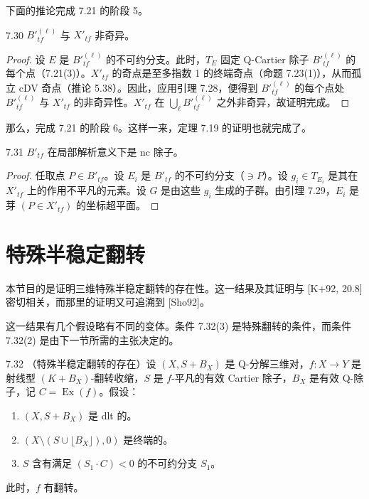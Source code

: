 下面的推论完成 7.21 的阶段 5。

\begin{corollaryp}{7.30}
$B'^{(\ell)}_{tf}$ 与 $X'_{tf}$ 非奇异。
\end{corollaryp}

\begin{proof}
设 $E$ 是 $B'^{(\ell)}_{tf}$ 的不可约分支。此时，$T_E$ 固定 Q-Cartier 除子 $B'^{(\ell)}_{tf}$ 的每个点（7.21(3)）。$X'_{tf}$ 的奇点是至多指数 1 的终端奇点（命题 7.23(1)），从而孤立 cDV 奇点（推论 5.38）。因此，应用引理 7.28，便得到 $B'^{(\ell)}_{tf}$ 的每个点处 $B'^{(\ell)}_{tf}$ 与 $X'_{tf}$ 的非奇异性。$X'_{tf}$ 在 $\bigcup_\ell B'^{(\ell)}_{tf}$ 之外非奇异，故证明完成。
\end{proof}

那么，完成 7.21 的阶段 6。这样一来，定理 7.19 的证明也就完成了。

\begin{lemmap}{7.31}
$B'_{tf}$ 在局部解析意义下是 nc 除子。
\end{lemmap}

\begin{proof}
任取点 $P\in B'_{tf}$。设 $E_i$ 是 $B'_{tf}$ 的不可约分支（$\ni P$）。设 $g_i\in T_{E_i}$ 是其在 $X'_{tf}$ 上的作用不平凡的元素。设 $G$ 是由这些 $g_i$ 生成的子群。由引理 7.29，$E_i$ 是芽 $(P\in X'_{tf})$ 的坐标超平面。
\end{proof}

\section{特殊半稳定翻转}

本节目的是证明三维特殊半稳定翻转的存在性。这一结果及其证明与 [K+92, 20.8] 密切相关，而那里的证明又可追溯到 [Sho92]。

这一结果有几个假设略有不同的变体。条件 7.32(3) 是特殊翻转的条件，而条件 7.32(2) 是由下一节所需的主张决定的。

\begin{theorem*}{7.32}
（特殊半稳定翻转的存在）设 $(X,S+B_X)$ 是 Q-分解三维对，$f\colon X\to Y$ 是射线型 $(K+B_X)$-翻转收缩，$S$ 是 $f$-平凡的有效 Cartier 除子，$B_X$ 是有效 Q-除子，记 $C=\operatorname{Ex}(f)$。假设：
\begin{enumerate}[label=(\arabic*),leftmargin=2.4em,itemsep=1pt,topsep=2pt,parsep=0pt]
\item $(X,S+B_X)$ 是 dlt 的。
\item $(X\setminus(S\cup\lfloor B_X\rfloor),0)$ 是终端的。
\item $S$ 含有满足 $(S_1\cdot C)<0$ 的不可约分支 $S_1$。
\end{enumerate}
此时，$f$ 有翻转。
\end{theorem*}

